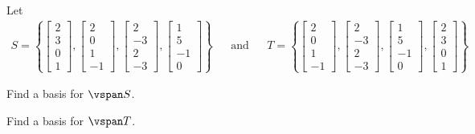 \begin{applicationActivities}
\begin{activity}{10}
  Let
  \begin{align*}
  S=\left\{
  \begin{bmatrix}2\\3\\0\\1\end{bmatrix},
  \begin{bmatrix}2\\0\\1\\-1\end{bmatrix},
  \begin{bmatrix}2\\-3\\2\\-3\end{bmatrix},
  \begin{bmatrix}1\\5\\-1\\0\end{bmatrix}
  \right\} & & \text{and}  & &
  T=\left\{
  \begin{bmatrix}2\\0\\1\\-1\end{bmatrix},
  \begin{bmatrix}2\\-3\\2\\-3\end{bmatrix},
  \begin{bmatrix}1\\5\\-1\\0\end{bmatrix},
  \begin{bmatrix}2\\3\\0\\1\end{bmatrix}
  \right\}
  \end{align*}
  \begin{subactivity}
  Find a basis for \(\vspan S\).
  \end{subactivity}
  \begin{subactivity}
  Find a basis for \(\vspan T\).
  \end{subactivity}
\end{activity}


\end{applicationActivities}
